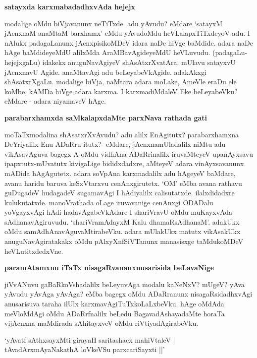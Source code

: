 {\bigskip
\noindent
{\large\bf satayxda karxmabadadhxvAda hejejx}}\label{page76}
\medskip

\noindent
modalige oMdu biVjavanunx neTiTxde. adu yAvudu? eMdare `satayxM jAcnxnaM anaMtaM barxhamx' eMdu yAvudoMdu heVLalapxTiTxdeyoV adu. I nAlukx padagaLanunx jAcnxpisikoMDeV idara naDe hiVge baMdide.\- adara naDe hAge baMdideyeMdU alilxMda AraMBavAgideyeMdU heVLuvudu. (padagaLu-hejejxgaLu) idakekx anuguNavAgiyeV shAsAtxrXvatAra. mUlavu satayxvU jAcnxnavU Agide. anaMtavAgi adu beLeya\-beVkAgide. adakAkxgi shAsatxrXgaLu. modalige biVja, naMtara adara moLake, AmeVle eraDu ele koMbe, kAMDa hiVge adara karxma. I karxmadiMdaleV Eke beLeyabeVku? eMdare - adara niyamaveV hAge.

{\bigskip
\noindent
{\large\bf parabarxhamxda saMkalapxdaMte parxNava rathada gati}}\label{page77}
\medskip

\noindent
moTaTxmodalina shAsatxrXvAvudu? adu alilx EnAgitutx? parabarxhamxna DeYriyalilx Enu ADaRru itutx?- eMdare, jAcnxnamUladalilx niMtu adu vikAsavAguva bagegx A oMdu vidhAna-ADaRrinalilx iru\-vaMteyeV upanAyxsavu ipapxtutx-mUvatutx kivigaLige bididxdadxre, aMteyeV adara vinAyxsavanunx mADida hAgAgutetx. adara soVpAna karxmadalilx adu hAgeyeV baMdare, avanu haridu baruva keSxVtarxvu cenAnxgirutetx. `OM' eMba avana rathavu guDugadeV hudagadeV sugamavAgi I hAdiyalilx calisutatxde. ilalxdidadxre kuluku\-tatxde. manoVrathada oLage iruvavanige cenAnxgi ODADalu yoVgayxvAgi hAdi hadavAgabeVkAdare I shariVravU oMdu muKayxvAda sAdhanavAgiruvudu. `shariVramAdayxM Kalu\label{77} dhamaRsAdhanaM'. adakUkx oMdu samAdhAnavAguvaMtirabeVku. adara mUlakUkx matutx vikAsakUkx anuguNavAgiratakakx oMdu pAlxyXnfSiVTanunx manasisxge taMdukoMDeV heVLutitxdedxVne.

{\bigskip
\noindent
{\large\bf paramAtamxnu iTaTx nisagaRvananxnusarisida beLavaNige}}\label{page77}
\medskip

\noindent
jiVvANuvu gaBaRkoVshadalilx beLeyuvAga modalu kaNeNxV? mUgeV? yAva yAvudu yAvAga\- yAvAga? eMba bagegx oMdu ADaRranunx nisagaRsidadhxvAgi anusarisuva taraha ilUlx karxmavAgiTuTx\-koLaLx\-beVku. hAge oMdAda meVloMdAgi oMdu ADaRrfnalilx beLedu BagavadAshayadaMte horaTa vijAcnxna maMdirada sAhitayxveV oMdu riVtiyadAgirabeVku.

\begin{shloka}
`yAvatf sAthxsayxMti girayaH saritashacx mahiVtaleV |\\\label{77}
tAvadArxmAyaNakathA loVkeVSu parxcariSayxti ||'
\end{shloka}

